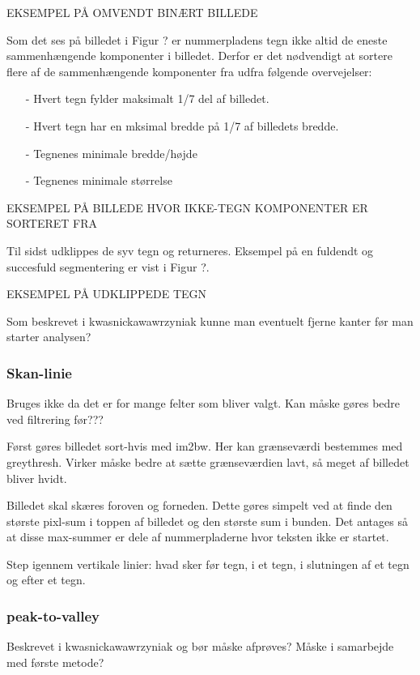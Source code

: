 EKSEMPEL PÅ OMVENDT BINÆRT BILLEDE

Som det ses på billedet i Figur ? er nummerpladens tegn ikke altid de eneste sammenhængende komponenter i billedet. Derfor er det nødvendigt at sortere flere af de sammenhængende komponenter fra udfra følgende overvejelser:

\begin{itemize}
\item[-] Hvert tegn fylder maksimalt 1/7 del af billedet.
\item[-] Hvert tegn har en mksimal bredde på 1/7 af billedets bredde.
\item[-] Tegnenes minimale bredde/højde
\item[-] Tegnenes minimale størrelse
\end{itemize}

EKSEMPEL PÅ BILLEDE HVOR IKKE-TEGN KOMPONENTER ER SORTERET FRA

Til sidst udklippes de syv tegn og returneres. Eksempel på en fuldendt og succesfuld segmentering er vist i Figur ?.

EKSEMPEL PÅ UDKLIPPEDE TEGN

Som beskrevet i kwasnickawawrzyniak kunne man eventuelt fjerne kanter før man starter analysen?

\subsubsection{Skan-linie}
Bruges ikke da det er for mange felter som bliver valgt. Kan måske gøres bedre ved filtrering før???

Først gøres billedet sort-hvis med im2bw. Her kan grænseværdi bestemmes med greythresh. Virker måske bedre at sætte grænseværdien lavt, så meget af billedet bliver hvidt.

Billedet skal skæres foroven og forneden. Dette gøres simpelt ved at finde den største pixl-sum i toppen af billedet og den største sum i bunden. Det antages så at disse max-summer er dele af nummerpladerne hvor teksten ikke er startet.

Step igennem vertikale linier: hvad sker før tegn, i et tegn, i slutningen af et tegn og efter et tegn.

\subsubsection{peak-to-valley}

Beskrevet i kwasnickawawrzyniak og bør måske afprøves? Måske i samarbejde med første metode?

